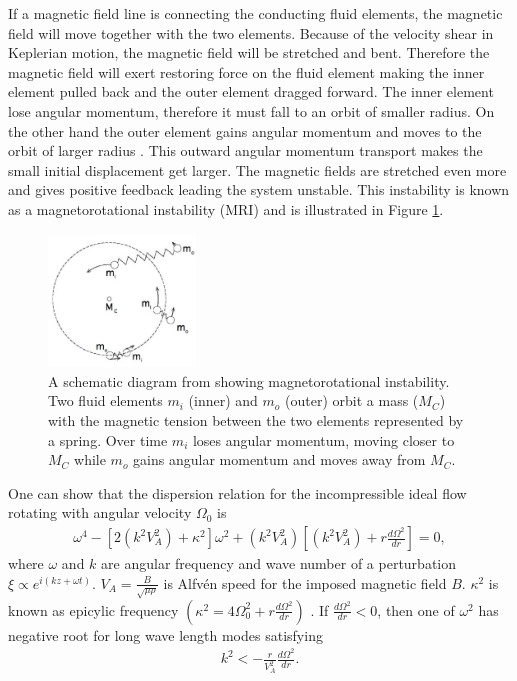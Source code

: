 \documentclass{jfm}
\begin{document}
If a magnetic field line is connecting the conducting fluid elements, the magnetic field will move together with the two elements. Because of the velocity shear in Keplerian motion, the magnetic field will be stretched and bent. Therefore the magnetic field will exert restoring force on the fluid element making the inner element pulled back and the outer element dragged forward. The inner element lose angular momentum, therefore it must fall to an orbit of smaller radius. On the other hand the outer element gains angular momentum and moves to the orbit of larger radius \cite[see][]{Balbus2011,Wiki:MRI}. This outward angular momentum transport makes the small initial displacement get larger. The magnetic fields are stretched even more and gives positive feedback leading the system unstable. This instability is known as a magnetorotational instability (MRI) and is illustrated in Figure \ref{fig:mri}.

\begin{figure}[t]
    \centering
    \includegraphics[width=0.35\textwidth]{Balbus2009_diagram}
        \caption{A schematic diagram from \cite{Balbus2011} showing magnetorotational instability. Two fluid elements $m_i$ (inner) and $m_o$ (outer) orbit a mass ($M_C$) with the magnetic tension between the two elements represented by a spring. Over time $m_i$ loses angular momentum, moving closer to $M_C$ while $m_o$ gains angular momentum and moves away from $M_C$.}
        \label{fig:mri}
\end{figure}

One can show that the dispersion relation for the incompressible ideal flow rotating with angular velocity $\Omega_0$ is
\begin{align}
    \omega^4-\left[2\left(k^2 V_A^2\right) +\kappa^2\right]\omega^2 +\left(k^2 V_A^2\right)\left[\left(k^2 V_A^2\right)+r\frac{d \Omega^2}{dr}\right]=0,
\end{align}
where $\omega$ and $k$ are angular frequency and wave number of a perturbation $\xi \propto e^{i(k z+\omega t)}$. $V_A=\frac{B}{\sqrt{\mu \rho}}$ is Alfv\'en speed for the imposed magnetic field $B$. $\kappa^2$ is known as epicylic frequency $\left(\kappa^2=4\Omega_0^2 + r \frac{d \Omega^2}{dr}\right)$ \citep[see][]{Balbus1991,Balbus1998,Balbus2003}. If $\frac{d \Omega^2}{dr}<0$, then one of $\omega^2$ has negative root for long wave length modes satisfying
\begin{align}
    k^2 < -\frac{r}{V_A^2}\frac{d\Omega^2}{dr}.
\end{align}
\end{document}
